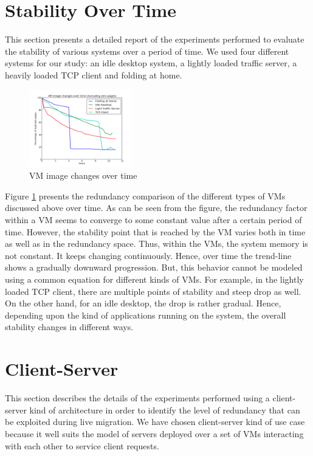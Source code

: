 \documentclass{acm_proc_article-sp}
\begin{document}
\section{Stability Over Time}
This section presents a detailed report of the experiments performed to evaluate the stability of various systems over a period of time. We used four different systems for our study: an idle desktop system, a lightly loaded traffic server, a heavily loaded TCP client and folding at home.


\begin{figure}
  \centering
  \includegraphics[width=0.4\textwidth]{images/vm_vs_time.png}
  \caption{VM image changes over time}\label{fig:vm_vs_time}
\end{figure}

Figure \ref{fig:vm_vs_time} presents the redundancy comparison of the different types of VMs discussed above over time. As can be seen from the figure, the redundancy factor within a VM seems to converge to some constant value after a certain period of time. However, the stability point that is reached by the VM varies both in time as well as in the redundancy space. Thus, within the VMs, the system memory is not constant. It keeps changing continuously. Hence, over time the trend-line shows a gradually downward progression. But, this behavior cannot be modeled using a common equation for different kinds of VMs. For example, in the lightly loaded TCP client, there are multiple points of stability and steep drop as well. On the other hand, for an idle desktop, the drop is rather gradual. Hence, depending upon the kind of applications running on the system, the overall stability changes in different ways.

\section{Client-Server}
This section describes the details of the experiments performed using a client-server kind of architecture in order to identify the level of redundancy that can be exploited during live migration. We have chosen client-server kind of use case because it well suits the model of servers deployed over a set of VMs interacting with each other to service client requests.
\end{document}

